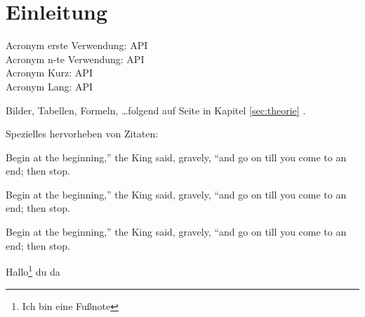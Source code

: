 \section{Einleitung}
\label{sec:einleitung}

Acronym erste Verwendung: \ac{API} \\
Acronym n-te Verwendung: \ac{API} \\
Acronym Kurz: \acs{API} \\
Acronym Lang: \acl{API}

\bigskip

Bilder, Tabellen, Formeln, \dots folgend auf Seite \pageref{sec:theorie} in Kapitel \ref{sec:theorie} .

\bigskip

Spezielles hervorheben von Zitaten:

\begin{fquote}
	Begin at the beginning,'' the King said, gravely, ``and go on till you come to an end; then stop.
\end{fquote}

\begin{fquote}
	Begin at the beginning,'' the King said, gravely, ``and go on till you come to an end; then stop.
\end{fquote}

\begin{fquote}
	Begin at the beginning,'' the King said, gravely, ``and go on till you come to an end; then stop.
\end{fquote}

Hallo\footnote{Ich bin eine Fußnote} du da